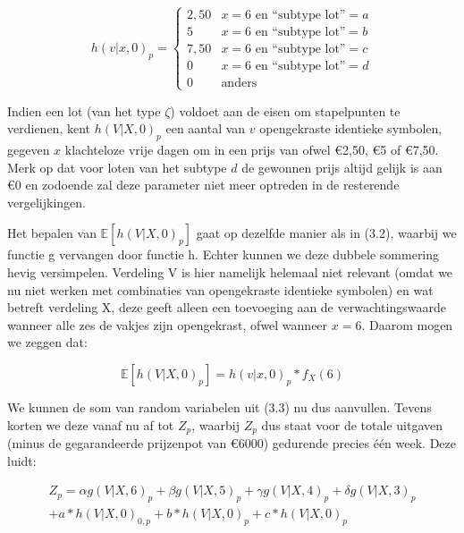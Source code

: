 \begin{equation}
  h(v|x,0)_{p} =
  \begin{cases}
    2,50 & x = 6 \mbox{ en ``subtype lot''}= a \\
    5 & x = 6 \mbox{ en ``subtype lot''}= b \\
    7,50 & x = 6 \mbox{ en ``subtype lot''}= c \\
    0 & x = 6 \mbox{ en ``subtype lot''}= d \\
    0 & \mbox{anders}
  \end{cases}
\end{equation}

Indien een lot (van het type $\zeta$) voldoet aan de eisen om stapelpunten te verdienen, kent $h(V|X,0)_{p}$ een aantal van $v$ opengekraste identieke symbolen, gegeven $x$ klachteloze vrije dagen om in een prijs van ofwel \euro2,50, \euro5 of \euro7,50. Merk op dat voor loten van het subtype $d$ de gewonnen prijs altijd gelijk is aan \euro0 en zodoende zal deze parameter niet meer optreden in de resterende vergelijkingen.

Het bepalen van $\mathbb{E}[h(V|X,0)_{p}]$ gaat op dezelfde manier als in (3.2), waarbij we functie g vervangen door functie h. Echter kunnen we deze dubbele sommering hevig versimpelen. Verdeling V is hier namelijk helemaal niet relevant (omdat we nu niet werken met combinaties van opengekraste identieke symbolen) en wat betreft verdeling X, deze geeft alleen een toevoeging aan de verwachtingswaarde wanneer alle zes de vakjes zijn opengekrast, ofwel wanneer $x=6$. Daarom mogen we zeggen dat:

\begin{equation}
\mathbb{E}[h(V|X,0)_{p}] = h(v|x,0)_{p}*f_{X}(6)
\end{equation}

We kunnen de som van random variabelen uit (3.3) nu dus aanvullen. Tevens korten we deze vanaf nu af tot $Z_{p}$, waarbij $Z_{p}$ dus staat voor de totale uitgaven (minus de gegarandeerde prijzenpot van \euro6000) gedurende precies één week. Deze luidt:

\begin{equation}
\begin{aligned}
Z_{p} = \alpha g(V|X,6)_{p} + \beta g(V|X,5)_{p} + \gamma g(V|X,4)_{p} + \delta g(V|X,3)_{p}  \\ 
+ a*h(V|X,0)_{0,p} +b*h(V|X,0)_{p} +c*h(V|X,0)_{p}
\end{aligned}
\end{equation}

